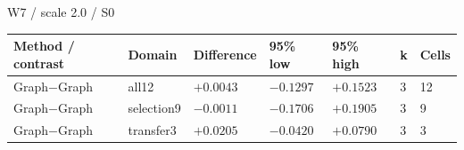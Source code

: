 \par\noindent W7 / scale 2.0 / S0
\par\nopagebreak[4]
\begin{tabular}{lllllll}
\hline
Method / contrast & Domain & Difference & 95\% low & 95\% high & k & Cells \\
\hline
Graph\ensuremath{-}Graph & all12 & $+0.0043$ & $-0.1297$ & $+0.1523$ & 3 & 12 \\
Graph\ensuremath{-}Graph & selection9 & $-0.0011$ & $-0.1706$ & $+0.1905$ & 3 & 9 \\
Graph\ensuremath{-}Graph & transfer3 & $+0.0205$ & $-0.0420$ & $+0.0790$ & 3 & 3 \\
\hline
\end{tabular}



